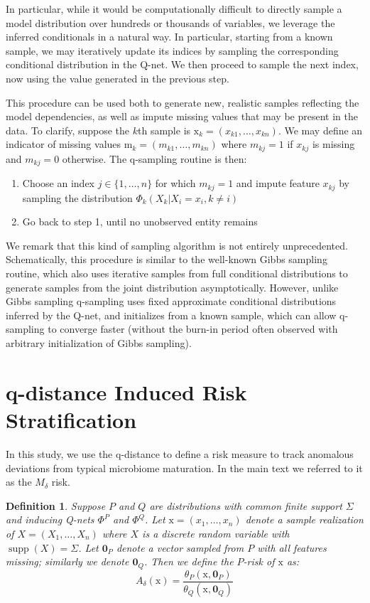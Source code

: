 \documentclass[onecolumn,10pt]{IEEEtran}
\newtheorem{defn}{Definition}
\def\x{\bm{\mathrm{x}}}
\def\qnet{Q-net\xspace}
\def\qdist{q-distance\xspace}
\def\qsamp{q-sampling\xspace}
\def\x{\bm{\mathrm{x}}}
\def\erisk{$M_\delta$\xspace}
\def\RHO{A_\delta}
\begin{document}
In particular, while it would be computationally difficult to directly sample a model distribution over hundreds or thousands of variables, we leverage the inferred conditionals in a natural way.  In particular, starting from a known sample, we may iteratively update its indices by sampling the corresponding conditional distribution in the \qnet.  We then proceed to sample the next index, now using the value generated in the previous step.  

This procedure can be used both to generate new, realistic samples reflecting the model dependencies, as well as impute missing values that may be present in the data.  To clarify, suppose the $k$th sample is $\x_k = (x_{k1}, \ldots, x_{kn})$.  We may define an indicator of missing values $\bm{\mathrm{m}}_k = (m_{k1}, \ldots, m_{kn})$ where $m_{kj} = 1$ if $x_{kj}$ is missing and $m_{kj}=0$ otherwise. The \qsamp routine is then:
\begin{enumerate}
\item Choose an index $j \in \{1,\ldots,n\}$ for which $m_{kj} = 1$ and impute feature $x_{kj}$ by sampling  the distribution $\Phi_k(X_k|X_i = x_i, k \neq i)$
\item Go back to step 1, until no unobserved entity remains
\end{enumerate}

We remark that this kind of sampling algorithm is not entirely unprecedented. Schematically, this procedure is similar to the well-known Gibbs sampling routine\cite{gelfand1990sampling,geman1984stochastic}, which also uses iterative samples from full conditional distributions to generate samples from the joint distribution asymptotically. However, unlike Gibbs sampling \qsamp uses fixed approximate conditional distributions inferred by the \qnet, and initializes from a known sample, which can allow \qsamp to converge faster (without the burn-in period often observed with arbitrary initialization of Gibbs sampling). 




\section{\qdist Induced Risk Stratification}

In this study, we use the \qdist to define a risk measure to track anomalous deviations from typical microbiome maturation. In the main text we referred to it as the \erisk risk.

\begin{defn}
\label{def:risk}
Suppose $P$ and $Q$ are distributions with common finite support $\Sigma$ and inducing {\qnet}s $\Phi^P$ and $\Phi^Q$.  Let $\x = (x_1, \ldots, x_n)$ denote a sample realization of $X = (X_1, \ldots, X_n)$ where $X$ is a discrete random variable with $\operatorname{supp}(X) = \Sigma$. Let $\bm{0}_P$ denote a vector sampled from $P$ with all features missing; similarly we denote $\bm{0}_Q$. Then we define the $P$-risk of $\x$ as: \[ \RHO(\x) = \frac{\theta_P(\x,\bm{0}_P)}{\theta_Q(\x,\bm{0}_Q)}\]
\end{defn}
\end{document}
